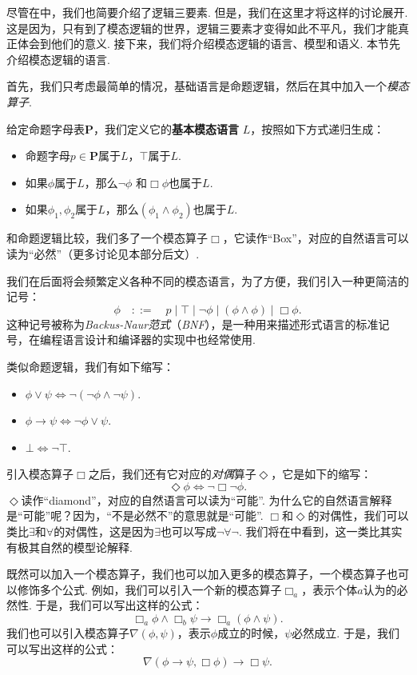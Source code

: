 尽管在中，我们也简要介绍了逻辑三要素. 但是，我们在这里才将这样的讨论展开. 这是因为，只有到了模态逻辑的世界，逻辑三要素才变得如此不平凡，我们才能真正体会到他们的意义. 接下来，我们将介绍模态逻辑的语言、模型和语义. 本节先介绍模态逻辑的语言. 

首先，我们只考虑最简单的情况，基础语言是命题逻辑，然后在其中加入一个\textit{模态算子}. 

\begin{definition}[基本模态语言]
给定命题字母表$\mathbf P$，我们定义它的\textbf{基本模态语言} $L$，按照如下方式递归生成：
\begin{itemize}
    \item 命题字母$p\in \mathbf P$属于$L$，$\top$属于$L$. 
    \item 如果$\phi$属于$L$，那么$\neg\phi$ 和$\Box\phi$也属于$L$. 
    \item 如果$\phi_1,\phi_2$属于$L$，那么$(\phi_1\wedge\phi_2)$也属于$L$. 
\end{itemize}
\end{definition}

和命题逻辑比较，我们多了一个模态算子$\Box$，它读作“Box”，对应的自然语言可以读为“必然”（更多讨论见本部分后文）. 

我们在后面将会频繁定义各种不同的模态语言，为了方便，我们引入一种更简洁的记号：
\[\phi\quad::=\quad p\mid \top\mid \neg\phi\mid (\phi\wedge\phi)\mid \Box\phi.\]
这种记号被称为\textit{Backus-Naur范式}（\textit{BNF}），是一种用来描述形式语言的标准记号，在编程语言设计和编译器的实现中也经常使用. 

类似命题逻辑，我们有如下缩写：
\begin{itemize}
    \item $\phi\vee\psi\iff\neg(\neg \phi\wedge\neg\psi)$.
    \item $\phi\to\psi\iff\neg\phi\vee\psi$.
    \item $\bot\iff\neg\top$.
\end{itemize}

引入模态算子$\Box$之后，我们还有它对应的\textit{对偶}算子$\Diamond$，它是如下的缩写：
\[\Diamond\phi\iff\neg\Box\neg\phi.\]
$\Diamond$读作“diamond”，对应的自然语言可以读为“可能”. 为什么它的自然语言解释是“可能”呢？因为，“不是必然不”的意思就是“可能”. $\Box$和$\Diamond$的对偶性，我们可以类比$\exists$和$\forall$的对偶性，这是因为$\exists$也可以写成$\neg\forall\neg$. 我们将在中看到，这一类比其实有极其自然的模型论解释. 

既然可以加入一个模态算子，我们也可以加入更多的模态算子，一个模态算子也可以修饰多个公式. 例如，我们可以引入一个新的模态算子$\Box_a$，表示个体$a$认为的必然性. 于是，我们可以写出这样的公式：
\[\Box_a\phi\wedge\Box_b\psi\to\Box_a(\phi\wedge\psi).\]
我们也可以引入模态算子$\nabla(\phi,\psi)$，表示$\phi$成立的时候，$\psi$必然成立. 于是，我们可以写出这样的公式：
\[\nabla(\phi\to\psi,\Box\phi)\to\Box\psi.\]

